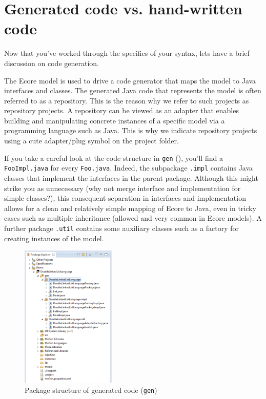 \newpage
\genHeader
\hypertarget{codeGen common}{} 
\chapter{Generated code vs. hand-written code}

Now that you've worked through the specifics of your syntax, lets have a brief discussion on code generation.

The Ecore model is used to drive a code generator that maps the model to Java interfaces and classes. The generated Java code that represents the model is often
referred to as a repository. This is the reason why we refer to such projects as repository projects. A repository can be viewed as an adapter that enables
building and manipulating concrete instances of a specific model via a programming language such as Java. This is why we indicate repository projects using a
cute adapter/plug symbol on the project folder.

If you take a careful look at the code structure in \texttt{gen} (), you'll find a \texttt{FooImpl.java} for every
\texttt{Foo.java}. Indeed, the subpackage \texttt{.impl} contains Java classes that implement the interfaces in the parent package. Although this might strike
you as unnecessary (why not merge interface and implementation for simple classes?), this consequent separation in interfaces and implementation allows for a
clean and relatively simple mapping of Ecore to Java, even in tricky cases such as multiple inheritance (allowed and very common in Ecore models). A further
package \texttt{.util} contains some auxiliary classes such as a factory for creating instances of the model.

 \begin{figure}[htbp]
  \centering
  \includegraphics[width=0.4\textwidth]{../../org.moflon.doc.handbook.01_installation/5_codeGeneration/eclipse_structureGen}
  \caption{Package structure of generated code (\texttt{gen})}
  \label{eclipse:structureGen}
\end{figure}

